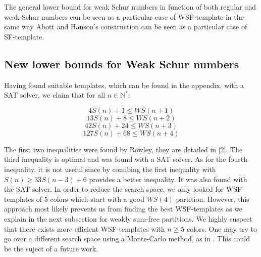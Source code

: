 \begin{corollary}
The general lower bound for weak Schur numbers in function of both regular and weak Schur numbers can be seen as a particular 
case of WSF-template in the same way Abott and Hanson's construction can be seen as a particular case of SF-template.
\end{corollary}


\subsection{New lower bounds for Weak Schur numbers}
Having found suitable templates, which can be found in the appendix, with a SAT solver, we claim that for all \(n \in
\mathbb{N}^*\):

\[
4S(n) + 1 \leqslant WS(n+1)
\]
\[
13S(n) + 8 \leqslant WS(n+2)
\]
\[
42S(n) + 24 \leqslant WS(n+3)
\]
\[
127S(n) + 68 \leqslant WS(n+4)
\]

The first two inequalities were found by Rowley, they are detailed in [2]. The third inequality is optimal and was found with a SAT solver. 
As for the fourth inequality, it is not useful since by comibing the first inequality with \(S(n) \geqslant 33 S(n-3) + 6\) provides a 
better inequality. It was also found with the SAT solver. In order to reduce the search space, we only looked for WSF-templates of 
5 colors which start with a good \(WS(4)\) partition. However, this approach most likely prevents us from finding the best WSF-templates 
as we explain in the next subsection for weakly sum-free partitions. We highly suspect that there exists more efficient WSF-templates 
with \(n \geqslant 5\) colors. One may try to go over a different search space using a Monte-Carlo method, as in \cite{Bouzy2015AnAP}. 
This could be the suject of a future work.

